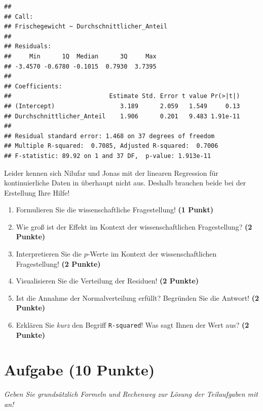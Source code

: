 \documentclass[a4paper, 9pt]{scrartcl}\usepackage[]{graphicx}\usepackage[]{xcolor}
\makeatletter
\newenvironment{kframe}{%
 \def\at@end@of@kframe{}%
 \ifinner\ifhmode%
  \def\at@end@of@kframe{\end{minipage}}%
  \begin{minipage}{\columnwidth}%
 \fi\fi%
 \def\FrameCommand##1{\hskip\@totalleftmargin \hskip-\fboxsep
 \colorbox{shadecolor}{##1}\hskip-\fboxsep
     \hskip-\linewidth \hskip-\@totalleftmargin \hskip\columnwidth}%
 \MakeFramed {\advance\hsize-\width
   \@totalleftmargin\z@ \linewidth\hsize
   \@setminipage}}%
 {\par\unskip\endMakeFramed%
 \at@end@of@kframe}
\newenvironment{knitrout}{}{} %
\makeatother
\begin{document}
\begin{knitrout}
\color{fgcolor}\begin{kframe}
\begin{verbatim}
## 
## Call:
## Frischegewicht ~ Durchschnittlicher_Anteil
## 
## Residuals:
##     Min      1Q  Median      3Q     Max 
## -3.4570 -0.6780 -0.1015  0.7930  3.7395 
## 
## Coefficients:
##                           Estimate Std. Error t value Pr(>|t|)
## (Intercept)                  3.189      2.059   1.549     0.13
## Durchschnittlicher_Anteil    1.906      0.201   9.483 1.91e-11
## 
## Residual standard error: 1.468 on 37 degrees of freedom
## Multiple R-squared:  0.7085,	Adjusted R-squared:  0.7006 
## F-statistic: 89.92 on 1 and 37 DF,  p-value: 1.913e-11
\end{verbatim}
\end{kframe}
\end{knitrout}

Leider kennen sich Nilufar und Jonas mit der linearen Regression für kontinuierliche Daten in \Rlogo überhaupt nicht aus. Deshalb brauchen beide bei der Erstellung Ihre Hilfe!


\begin{enumerate}
\item Formulieren Sie die wissenschaftliche Fragestellung! \textbf{(1 Punkt)}
\item Wie groß ist der Effekt im Kontext der wissenschaftlichen Fragestellung? \textbf{(2 Punkte)} 
\item Interpretieren Sie die $p$-Werte im Kontext der wissenschaftlichen Fragestellung! \textbf{(2 Punkte)}
\item Visualisieren Sie die Verteilung der Residuen! \textbf{(2 Punkte)} 
\item Ist die Annahme der Normalverteilung erfüllt? Begründen Sie die Antwort! \textbf{(2 Punkte)}
\item Erklären Sie \textit{kurz} den Begriff \texttt{R-squared}! Was sagt Ihnen der Wert aus? \textbf{(2 Punkte)}
\end{enumerate}
 
\clearpage

\section{Aufgabe \hfill (10 Punkte)}

\textit{Geben Sie grundsätzlich Formeln und Rechenweg zur Lösung der Teilaufgaben mit an!} \\[1Ex]
 
\end{document}
